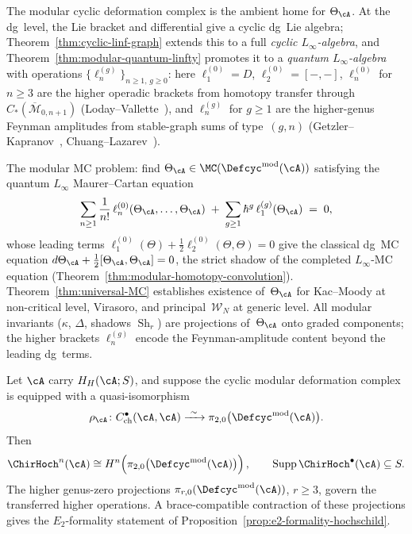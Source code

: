 \begin{remark}
\label{rem:chriss-ginzburg-modular-cyc}
The modular cyclic deformation complex is the ambient home for
$\Theta_\cA$. At the dg~level,
the Lie bracket and differential give a cyclic dg~Lie algebra;
Theorem~\ref{thm:cyclic-linf-graph} extends this to a full
\emph{cyclic $L_\infty$-algebra}, and
Theorem~\ref{thm:modular-quantum-linfty} promotes it to a
\emph{quantum $L_\infty$-algebra} with operations
$\{\ell_n^{(g)}\}_{n \geq 1,\, g \geq 0}$: here
$\ell_1^{(0)} = D$, $\ell_2^{(0)} = [-,-]$,
$\ell_n^{(0)}$ for $n \geq 3$ are the higher operadic brackets from
homotopy transfer through $C_*(\overline{\mathcal{M}}_{0,n+1})$
(Loday--Vallette~\cite[Thm~10.3.8]{LV12}), and
$\ell_n^{(g)}$ for $g \geq 1$ are the higher-genus Feynman
amplitudes from stable-graph sums of type~$(g,n)$
(Getzler--Kapranov~\cite[\S5]{GeK98},
Chuang--Lazarev~\cite{CL10}).

The modular MC problem: find
$\Theta_\cA \in \MC(\Defcyc^{\mathrm{mod}}(\cA))$ satisfying the
quantum $L_\infty$ Maurer--Cartan equation
\[
\sum_{n \geq 1} \frac{1}{n!}\,\ell_n^{(0)}
 (\Theta_\cA,\dots,\Theta_\cA)
\;+\;
\sum_{g \geq 1} \hbar^{g}\,
 \ell_1^{(g)}(\Theta_\cA)
\;=\; 0,
\]
whose leading terms $\ell_1^{(0)}(\Theta) + \tfrac{1}{2}\ell_2^{(0)}(\Theta,\Theta) = 0$ give
the classical dg~MC equation
$d\Theta_\cA + \tfrac{1}{2}[\Theta_\cA, \Theta_\cA] = 0$,
the strict shadow of the completed $L_\infty$-MC equation
(Theorem~\ref{thm:modular-homotopy-convolution}).
Theorem~\ref{thm:universal-MC} establishes existence of~$\Theta_\cA$
for Kac--Moody at non-critical level,
Virasoro, and principal~$\mathcal{W}_N$ at generic level.
All modular invariants ($\kappa$, $\Delta$, shadows
$\operatorname{Sh}_r$) are projections of~$\Theta_\cA$ onto graded
components; the higher brackets $\ell_n^{(g)}$ encode
the Feynman-amplitude content beyond the leading dg~terms.
\end{remark}

\begin{proposition}
\label{prop:hochschild-shadow-projection}

Let \(\cA\) carry \(H_H(\cA;S)\), and suppose the cyclic modular
deformation complex is equipped with a quasi-isomorphism
\[
 \rho_{\cA}\colon
 C^\bullet_{\mathrm{ch}}(\cA,\cA)
 \xrightarrow{\ \sim\ }
 \pi_{2,0}\bigl(\Defcyc^{\mathrm{mod}}(\cA)\bigr).
\]
Then
\[
 \ChirHoch^n(\cA)
 \cong
 H^n\!\left(\pi_{2,0}
 \bigl(\Defcyc^{\mathrm{mod}}(\cA)\bigr)\right),
 \qquad
 \operatorname{Supp}\ChirHoch^\bullet(\cA)\subseteq S.
\]
The higher genus-zero projections
\(\pi_{r,0}(\Defcyc^{\mathrm{mod}}(\cA))\), \(r\geq3\), govern the
transferred higher operations.  A brace-compatible contraction of
these projections gives the \(E_2\)-formality statement of
Proposition~\ref{prop:e2-formality-hochschild}.
\end{proposition}

